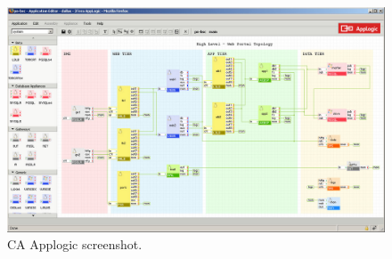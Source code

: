 \begin{figure}[tb]
  \includegraphics[width=\linewidth]{imgs/applogic.jpg}
  \caption{CA Applogic screenshot.}
  \label{fig:applogic}
\end{figure}
